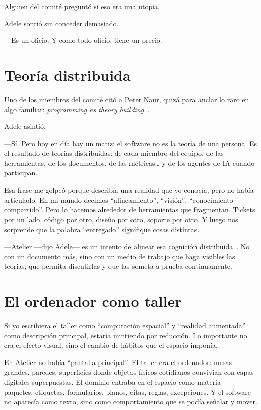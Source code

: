 \documentclass[11pt,a4paper]{article}
\begin{document}
Alguien del comité preguntó si eso era una utopía.

Adele sonrió sin conceder demasiado.

---Es un oficio. Y como todo oficio, tiene un precio.

\section{Teoría distribuida}

Uno de los miembros del comité citó a Peter Naur, quizá para anclar lo raro en
algo familiar: \emph{programming as theory building}~\cite{naur}.

Adele asintió.

---Sí. Pero hoy en día hay un matiz: el software no es la teoría de una
persona. Es el resultado de teorías distribuidas: de cada miembro del equipo,
de las herramientas, de los documentos, de las métricas\ldots{} y de los
agentes de IA cuando participan.

Esa frase me golpeó porque describía una realidad que yo conocía, pero no
había articulado. En mi mundo decimos ``alineamiento'', ``visión'',
``conocimiento compartido''. Pero lo hacemos alrededor de herramientas que
fragmentan. Tickets por un lado, código por otro, diseño por otro, soporte por
otro. Y luego nos sorprende que la palabra ``entregado'' signifique cosas
distintas.

---Atelier ---dijo Adele--- es un intento de alinear esa cognición
distribuida~\cite{dcog}. No con un documento más, sino con un medio de trabajo
que haga visibles las teorías, que permita discutirlas y que las someta a
prueba continuamente.

\section{El ordenador como taller}

Si yo escribiera el taller como ``computación espacial'' y ``realidad
aumentada'' como descripción principal, estaría mintiendo por reducción. Lo
importante no era el efecto visual, sino el cambio de hábitos que el espacio
imponía.

En Atelier no había ``pantalla principal''. El taller era el ordenador: mesas
grandes, paredes, superficies donde objetos físicos cotidianos convivían con
capas digitales superpuestas. El dominio entraba en el espacio como materia
---paquetes, etiquetas, formularios, planos, citas, reglas, excepciones. Y el
software no aparecía como texto, sino como comportamiento que se podía señalar
y mover.
\end{document}
